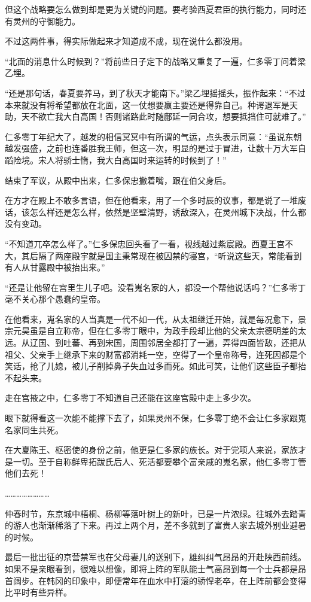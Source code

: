 但这个战略要怎么做到却是更为关键的问题。要考验西夏君臣的执行能力，同时还有灵州的守御能力。

不过这两件事，得实际做起来才知道成不成，现在说什么都没用。

“北面的消息什么时候到？”将前些日子定下的战略又重复了一遍，仁多零丁问着梁乙埋。

“还是那句话，春夏要养马，到了秋天才能南下。”梁乙埋摇摇头，振作起来：“不过本来就没有将希望都放在北面，这一仗想要赢主要还是得靠自己。种谔退军是天助，天不欲亡我大白高国！否则诸路此时随鄜延一同合攻，想要抵挡住可就难了。”

仁多零丁年纪大了，越发的相信冥冥中有所谓的气运，点头表示同意：“虽说东朝越发强盛，之前也连番胜我王师，但这一次，明显的是过于冒进，让数十万大军自蹈险境。宋人将骄士惰，我大白高国时来运转的时候到了！”

结束了军议，从殿中出来，仁多保忠撇着嘴，跟在伯父身后。

在方才在殿上不敢多言语，但在他看来，用了一个多时辰的议事，都是说了一堆废话，该怎么样还是怎么样，依然是坚壁清野，诱敌深入，在灵州城下决战，什么都没有变动。

“不知道兀卒怎么样了。”仁多保忠回头看了一看，视线越过紫宸殿。西夏王宫不大，其后隔了两座殿宇就是国主秉常现在被囚禁的寝宫，“听说这些天，常能看到有人从甘露殿中被抬出来。”

“还是让他留在宫里生儿子吧。没看嵬名家的人，都没一个帮他说话吗？”仁多零丁毫不关心那个愚蠢的皇帝。

在他看来，嵬名家的人当真是一代不如一代，从太祖继迁开始，就是每况愈下，景宗元昊虽是自立称帝，但在仁多零丁眼中，为政手段却比他的父亲太宗德明差的太远。从辽国、到吐蕃、再到宋国，周围邻居全都打了一遍，弄得四面皆敌，还把从祖父、父亲手上继承下来的财富都消耗一空，空得了一个皇帝称号，连死因都是个笑话，抢了儿媳，被儿子削掉鼻子失血过多而死。如此可笑，让他们这些臣子都抬不起头来。

走在宫掖之中，仁多零丁不知道自己还能在这座宫殿中走上多少次。

眼下就得看这一次能不能撑下去了，如果灵州不保，仁多零丁绝不会让仁多家跟嵬名家同生共死。

在大夏陈王、枢密使的身份之前，他更是仁多家的族长。对于党项人来说，家族才是一切。至于自称鲜卑拓跋氏后人、死活都要攀个富亲戚的嵬名家，他仁多零丁管他们去死！

……………………

仲春时节，东京城中梧桐、杨柳等落叶树上的新叶，已是一片浓绿。往城外去踏青的游人也渐渐稀落了下来。再过上两个月，差不多就到了富贵人家去城外别业避暑的时候。

最后一批出征的京营禁军也在父母妻儿的送别下，雄纠纠气昂昂的开赴陕西前线。如果不是亲眼看到，很难以想像，即将上阵的军队能士气高昂到每一个士兵都是昂首阔步。在韩冈的印象中，即便常年在血水中打滚的骄悍老卒，在上阵前都会变得比平时有些异样。

